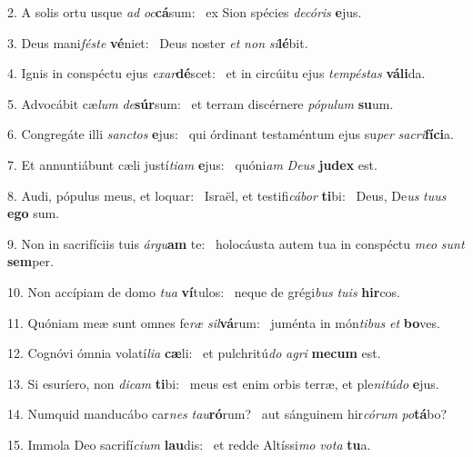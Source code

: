 2. A solis ortu usque \textit{ad} \textit{oc}\textbf{cá}sum: \ast\  ex Sion spécies \textit{de}\textit{có}\textit{ris} \textbf{e}jus.\

3. Deus mani\textit{fés}\textit{te} \textbf{vé}niet: \ast\  Deus noster \textit{et} \textit{non} \textit{si}\textbf{lé}bit.\

4. Ignis in conspéctu ejus \textit{ex}\textit{ar}\textbf{dé}scet: \ast\  et in circúitu ejus \textit{tem}\textit{pés}\textit{tas} \textbf{vá}\textbf{li}da.\

5. Advocábit cæ\textit{lum} \textit{de}\textbf{súr}sum: \ast\  et terram discérnere \textit{pó}\textit{pu}\textit{lum} \textbf{su}um.\

6. Congregáte illi \textit{sanc}\textit{tos} \textbf{e}jus: \ast\  qui órdinant testaméntum ejus su\textit{per} \textit{sa}\textit{cri}\textbf{fí}\textbf{ci}a.\

7. Et annuntiábunt cæli justí\textit{ti}\textit{am} \textbf{e}jus: \ast\  quóni\textit{am} \textit{De}\textit{us} \textbf{ju}\textbf{dex} est.\

8. Audi, pópulus meus, et loquar: \dag\  Israël, et testifi\textit{cá}\textit{bor} \textbf{ti}bi: \ast\  Deus, De\textit{us} \textit{tu}\textit{us} \textbf{e}\textbf{go} sum.\

9. Non in sacrifíciis tuis \textit{ár}\textit{gu}\textbf{am} te: \ast\  holocáusta autem tua in conspéctu \textit{me}\textit{o} \textit{sunt} \textbf{sem}per.\

10. Non accípiam de domo \textit{tu}\textit{a} \textbf{ví}tulos: \ast\  neque de grégi\textit{bus} \textit{tu}\textit{is} \textbf{hir}cos.\

11. Quóniam meæ sunt omnes fe\textit{ræ} \textit{sil}\textbf{vá}rum: \ast\  juménta in món\textit{ti}\textit{bus} \textit{et} \textbf{bo}ves.\

12. Cognóvi ómnia volatí\textit{li}\textit{a} \textbf{cæ}li: \ast\  et pulchritú\textit{do} \textit{a}\textit{gri} \textbf{me}\textbf{cum} est.\

13. Si esuríero, non \textit{di}\textit{cam} \textbf{ti}bi: \ast\  meus est enim orbis terræ, et ple\textit{ni}\textit{tú}\textit{do} \textbf{e}jus.\

14. Numquid manducábo car\textit{nes} \textit{tau}\textbf{ró}rum? \ast\  aut sánguinem hir\textit{có}\textit{rum} \textit{po}\textbf{tá}bo?\

15. Immola Deo sacrifí\textit{ci}\textit{um} \textbf{lau}dis: \ast\  et redde Altíssi\textit{mo} \textit{vo}\textit{ta} \textbf{tu}a.\


